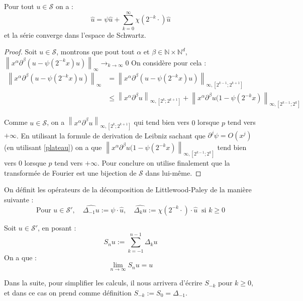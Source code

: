 \documentclass[11pt,a4paper]{article}
\begin{document}
\begin{lemma}\label{decomp}
Pour tout $u \in \mathcal{S}$ on a :
\[ \hat{u} = \psi \hat{u} + \sum_{k=0}^\infty \chi(2^{-k} \cdot) \hat{u} \]
et la série converge dans l'espace de Schwartz.
\end{lemma}
\begin{proof}
Soit $u \in \mathcal{S}$, montrons que pout tout $\alpha$ et $\beta \in \mathbb{N}\times \mathbb{N}^d $, $\left\lVert x^\alpha \partial^\beta(u-\psi(2^{-k}x)u) \right\rVert_\infty \to_{k\to \infty} 0$
On considère pour cela :
\begin{align*}
    \left\lVert x^\alpha \partial^\beta(u-\psi(2^{-k}x)u)\right\rVert_\infty &= \left\lVert x^\alpha \partial^\beta(u-\psi(2^{-k}x)u)\right\rVert_{\infty,[2^{k-1};2^{k+1}]} \\
    &\leq \left\lVert x^\alpha \partial^\beta u\right\rVert_{\infty,[2^{k};2^{k+1}]} + \left\lVert x^\alpha \partial^\beta u(1-\psi(2^{-k}x)\right\rVert_{\infty,[2^{k-1};2^{k}]}
\end{align*}

Comme $u \in \mathcal{S}$, on a $\left\lVert x^\alpha \partial^\beta u\right\rVert_{\infty,[2^{k};2^{k+1}]}$ qui tend bien vers $0$ lorsque $p$ tend vers $+\infty$. En utilisant la formule de derivation de Leibniz sachant que $\partial^j \psi = O(x^{j})$ (en utilisant \eqref{plateau}) on a que $\left\lVert x^\alpha \partial^\beta u(1-\psi(2^{-k}x)\right\rVert_{\infty,[2^{k-1};2^{k}]}$ tend bien vers $0$ lorsque $p$ tend vers $+\infty$. Pour conclure on utilise finalement que la transformée de Fourier est une bijection de $\mathcal{S}$ dans lui-même.
\end{proof}

\begin{defin}
On définit les opérateurs de la décomposition de Littlewood-Paley de la manière suivante :
\[
\text{Pour } u \in \mathcal{S}', \quad \widehat{\Delta_{-1} u} := \psi \cdot \hat{u}, \quad \widehat{\Delta_{k} u} := \chi(2^{-k} \cdot) \cdot \hat{u} \ \text{ si } k \geq 0
\]
\end{defin}

\begin{prop}
Soit $u \in \mathcal{S}'$, en posant :
\[ S_n u := \sum_{k=-1}^{n-1} \Delta_k u \]
On a que :
\[ \lim_{n \to \infty} S_n u = u \]
\end{prop}
\begin{rmq}
Dans la suite, pour simplifier les calculs, il nous arrivera d'écrire $S_{-k}$ pour $k\geq 0$, et dans ce cas on prend comme définition $S_{-k} := S_{0} = \Delta_{-1}$.
\end{rmq}
\end{document}
